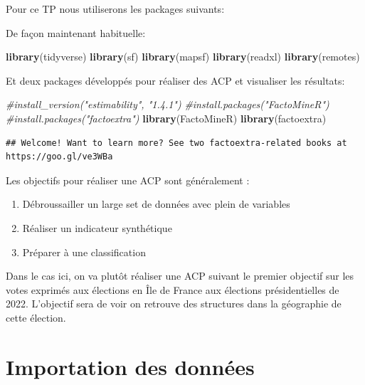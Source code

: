 \documentclass[
]{book}
\newenvironment{Shaded}{\begin{snugshade}}{\end{snugshade}}
\newcommand{\CommentTok}[1]{\textcolor[rgb]{0.56,0.35,0.01}{\textit{#1}}}
\newcommand{\FunctionTok}[1]{\textcolor[rgb]{0.13,0.29,0.53}{\textbf{#1}}}
\newcommand{\NormalTok}[1]{#1}
\begin{document}
Pour ce TP nous utiliserons les packages suivants:

De façon maintenant habituelle:

\begin{Shaded}
\begin{Highlighting}[]
\FunctionTok{library}\NormalTok{(tidyverse)}
\FunctionTok{library}\NormalTok{(sf)}
\FunctionTok{library}\NormalTok{(mapsf)}
\FunctionTok{library}\NormalTok{(readxl)}
\FunctionTok{library}\NormalTok{(remotes) }
\end{Highlighting}
\end{Shaded}

Et deux packages développés pour réaliser des ACP et visualiser les résultats:

\begin{Shaded}
\begin{Highlighting}[]
\CommentTok{\#install\_version("estimability", "1.4.1")}
\CommentTok{\#install.packages("FactoMineR") }
\CommentTok{\#install.packages("factoextra")}
\FunctionTok{library}\NormalTok{(FactoMineR)}
\FunctionTok{library}\NormalTok{(factoextra)}
\end{Highlighting}
\end{Shaded}

\begin{verbatim}
## Welcome! Want to learn more? See two factoextra-related books at https://goo.gl/ve3WBa
\end{verbatim}

Les objectifs pour réaliser une ACP sont généralement :

\begin{enumerate}
\def\labelenumi{\arabic{enumi}.}
\item
  Débroussailler un large set de données avec plein de variables
\item
  Réaliser un indicateur synthétique
\item
  Préparer à une classification
\end{enumerate}

Dans le cas ici, on va plutôt réaliser une ACP suivant le premier objectif sur les votes exprimés aux élections en Île de France aux élections présidentielles de 2022. L'objectif sera de voir on retrouve des structures dans la géographie de cette élection.

\hypertarget{importation-des-donnuxe9es}{%
\section{Importation des données}\label{importation-des-donnuxe9es}}
\end{document}

